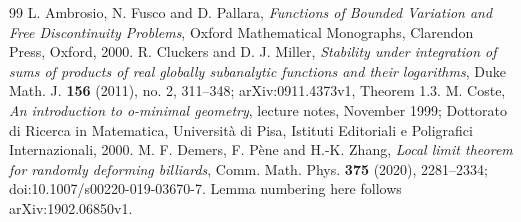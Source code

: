 \begin{thebibliography}{99}
 L. Ambrosio, N. Fusco and D. Pallara,
\emph{Functions of Bounded Variation and Free Discontinuity Problems},
Oxford Mathematical Monographs, Clarendon Press, Oxford, 2000.
 R. Cluckers and D. J. Miller,
\emph{Stability under integration of sums of products of real globally
subanalytic functions and their logarithms}, Duke Math. J.
\textbf{156} (2011), no. 2, 311--348; arXiv:0911.4373v1,
Theorem 1.3.
 M. Coste, \emph{An introduction to o-minimal geometry},
lecture notes, November 1999; Dottorato di Ricerca in Matematica,
Universit\`a di Pisa, Istituti Editoriali e Poligrafici Internazionali, 2000.
 M. F. Demers, F. P\`ene and H.-K. Zhang, \emph{Local limit theorem for randomly deforming billiards}, Comm. Math. Phys. \textbf{375} (2020), 2281--2334; doi:10.1007/s00220-019-03670-7. Lemma numbering here follows arXiv:1902.06850v1.
\end{thebibliography}

